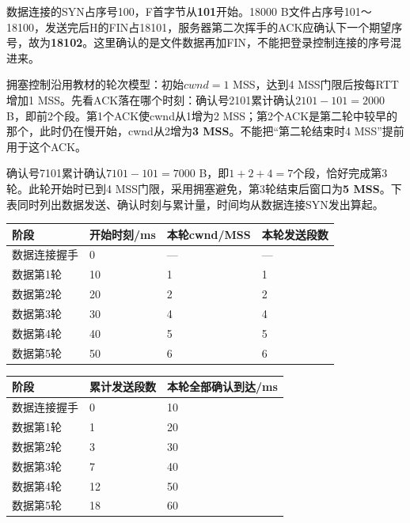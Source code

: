 数据连接的SYN占序号100，F首字节从\textbf{101}开始。18000 B文件占序号101～18100，发送完后H的FIN占18101，服务器第二次挥手的ACK应确认下一个期望序号，故为\textbf{18102}。这里确认的是文件数据再加FIN，不能把登录控制连接的序号混进来。

拥塞控制沿用教材的轮次模型：初始\(cwnd=1\) MSS，达到4 MSS门限后按每RTT增加1 MSS。先看ACK落在哪个时刻：确认号2101累计确认\(2101-101=2000\) B，即前2个段。第1个ACK使cwnd从1增为2 MSS；第2个ACK是第二轮中较早的那个，此时仍在慢开始，cwnd从2增为\textbf{3 MSS}。不能把``第二轮结束时4 MSS''提前用于这个ACK。

确认号7101累计确认\(7101-101=7000\) B，即\(1+2+4=7\)个段，恰好完成第3轮。此轮开始时已到4 MSS门限，采用拥塞避免，第3轮结束后窗口为\textbf{5 MSS}。下表同时列出数据发送、确认时刻与累计量，时间均从数据连接SYN发出算起。

\begin{wideblock}

\par\medskip\noindent\begin{minipage}{\linewidth}\fontsize{9.3}{12}\selectfont\begin{tabularx}{\linewidth}{@{}YYYY@{}}
\toprule\noalign{}
阶段 & 开始时刻/ms & 本轮cwnd/MSS & 本轮发送段数 \\
\midrule\noalign{}


数据连接握手 & 0 & --- & --- \\
数据第1轮 & 10 & 1 & 1 \\
数据第2轮 & 20 & 2 & 2 \\
数据第3轮 & 30 & 4 & 4 \\
数据第4轮 & 40 & 5 & 5 \\
数据第5轮 & 50 & 6 & 6 \\
\bottomrule\end{tabularx}
\end{minipage}\par\medskip

\end{wideblock}

\begin{wideblock}

\par\medskip\noindent\begin{minipage}{\linewidth}\fontsize{9.3}{12}\selectfont\begin{tabularx}{\linewidth}{@{}YYY@{}}
\toprule\noalign{}
阶段 & 累计发送段数 & 本轮全部确认到达/ms \\
\midrule\noalign{}


数据连接握手 & 0 & 10 \\
数据第1轮 & 1 & 20 \\
数据第2轮 & 3 & 30 \\
数据第3轮 & 7 & 40 \\
数据第4轮 & 12 & 50 \\
数据第5轮 & 18 & 60 \\
\bottomrule\end{tabularx}
\end{minipage}\par\medskip

\end{wideblock}

